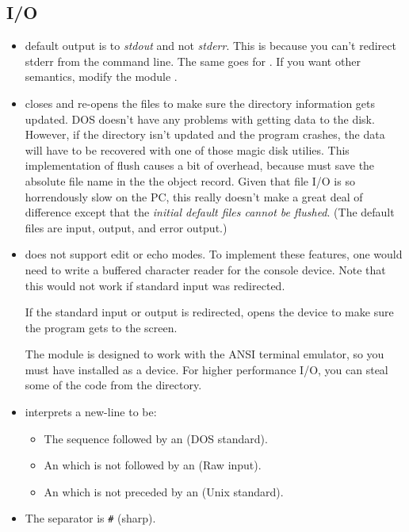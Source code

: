 \subsection{I/O}
\begin{itemize}
\item
     default output is to {\em stdout} and
    not {\em stderr}.  This is because you can't redirect stderr
    from the command line.  The same goes for 
    .  If you want other semantics, 
    modify the module .
    
\item
     closes and re-opens
    the files to make sure the directory information gets updated.
    DOS doesn't have any problems with getting data to the disk.
    However, if the directory isn't updated and the program crashes,
    the data will have to be recovered with one of those magic
    disk utilies.  This implementation of flush causes a bit of
    overhead, because 
    must save the absolute file name in the the object record.
    Given that file I/O is so horrendously slow on the PC, this 
    really doesn't make a great deal of difference except that
    the {\em initial default files cannot be flushed}.
    (The default files are input, output, and error output.)
\item
     does not support edit or echo modes.
    To implement these features, one would need to write a
    buffered character reader for the console device.  Note
    that this would not work if standard input was redirected.
    
    If the standard input or output is redirected, 
    opens the device  to make sure the program gets
    to the screen.
    
    The module is designed to work with the ANSI terminal emulator,
    so you must have  installed as a device.  For
    higher performance I/O, you can steal some of the code from the
     directory.
    
\item
     interprets a new-line to be:
    \begin{itemize}
    \item
	The sequence 
	followed by an  (DOS standard).
    \item
	An  which is not followed by an
	 (Raw input).
    \item
	An  which is not preceded by an
	 (Unix standard).
    \end{itemize}
\item
    The  separator is \verb!#! (sharp).
    

\end{itemize}
